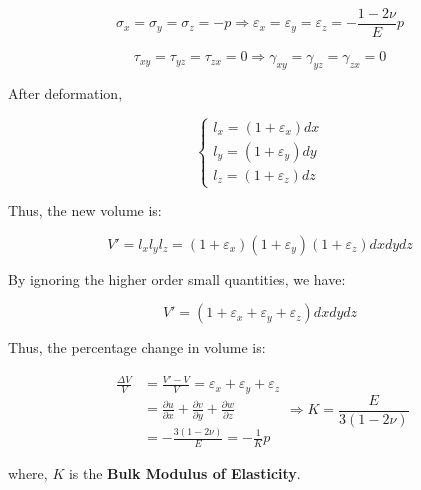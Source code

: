 \documentclass[en,hazy,cyan,8pt,normal]{elegantnote}
\numberwithin{equation}{section}
\begin{document}
    \begin{equation}\label{eq:067}
      \sigma_x = \sigma_y = \sigma_z = -p\Rightarrow \varepsilon_x = \varepsilon_y = \varepsilon_z = - \frac{1-2\nu}{E} p
    \end{equation}

    \begin{equation}\label{eq:068}
      \tau_{xy} = \tau_{yz} = \tau_{zx} = 0 \Rightarrow \gamma_{xy} = \gamma_{yz} = \gamma_{zx} = 0
    \end{equation}

    After deformation,

    \begin{equation}\label{eq:069}
      \left\{
      \begin{aligned}
        l_x=(1+\varepsilon_x)dx\\
        l_y=(1+\varepsilon_y)dy\\
        l_z=(1+\varepsilon_z)dz
      \end{aligned}
      \right.
    \end{equation}

    Thus, the new volume is:

    \begin{equation}\label{eq:070}
      V' = l_x l_y l_z = (1+\varepsilon_x)(1+\varepsilon_y)(1+\varepsilon_z)dx dy dz
    \end{equation}

    By ignoring the higher order small quantities, we have:

    \begin{equation}\label{eq:071}
      V' = (1+\varepsilon_x + \varepsilon_y + \varepsilon_z) dx dy dz
    \end{equation}

    Thus, the percentage change in volume is:

    \begin{equation}\label{eq:072}
      \begin{aligned}
        \frac{\Delta V} {V} &= \frac{V' - V}{V} = \varepsilon_x + \varepsilon_y + \varepsilon_z \\
        &= \frac{\partial u}{\partial x} + \frac{\partial v}{\partial y} + \frac{\partial w}{\partial z}\\
        &= - \frac{3(1-2\nu)}{E} =-\frac{1}{K} p
      \end{aligned}
      \Rightarrow K = \frac{E}{3(1-2\nu)}
    \end{equation}
  
    where, $K$ is the \textbf{Bulk Modulus of Elasticity}.
\end{document}
